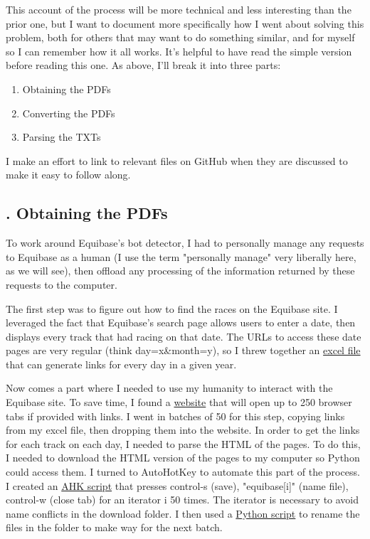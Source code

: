 \documentclass{article}
\begin{document}
This account of the process will be more technical and less interesting than the prior one, but I want to document more specifically how I went about solving this problem, both for others that may want to do something similar, and for myself so I can remember how it all works. It's helpful to have read the simple version before reading this one. As above, I'll break it into three parts:

\begin{enumerate}
  \item Obtaining the PDFs
  \item Converting the PDFs
  \item Parsing the TXTs
\end{enumerate}

\noindent I make an effort to link to relevant files on GitHub when they are discussed to make it easy to follow along.

\subsection*{. Obtaining the PDFs}

To work around Equibase's bot detector, I had to personally manage any requests to Equibase as a human (I use the term "personally manage" very liberally here, as we will see), then offload any processing of the information returned by these requests to the computer.

The first step was to figure out how to find the races on the Equibase site. I leveraged the fact that Equibase's search page allows users to enter a date, then displays every track that had racing on that date. The URLs to access these date pages are very regular (think day=x\&month=y), so I threw together an \href{https://github.com/Real-Karisch/horseData/blob/master/excel/generateDayLinks.xlsx}{excel file} that can generate links for every day in a given year.

Now comes a part where I needed to use my humanity to interact with the Equibase site. To save time, I found a \href{https://www.openmultipleurl.com/}{website} that will open up to 250 browser tabs if provided with links. I went in batches of 50 for this step, copying links from my excel file, then dropping them into the website. In order to get the links for each track on each day, I needed to parse the HTML of the pages. To do this, I needed to download the HTML version of the pages to my computer so Python could access them. I turned to AutoHotKey to automate this part of the process. I created an \href{https://github.com/Real-Karisch/horseData/blob/master/python/convertPDF/webScrape/saveHtmlHotkey.ahk}{AHK script} that presses control-s (save), "equibase[i]" (name file), control-w (close tab) for an iterator i 50 times. The iterator is necessary to avoid name conflicts in the download folder. I then used a \href{https://github.com/Real-Karisch/horseData/blob/master/python/convertPDF/webScrape/htmlMgmt.py}{Python script} to rename the files in the folder to make way for the next batch.
\end{document}

